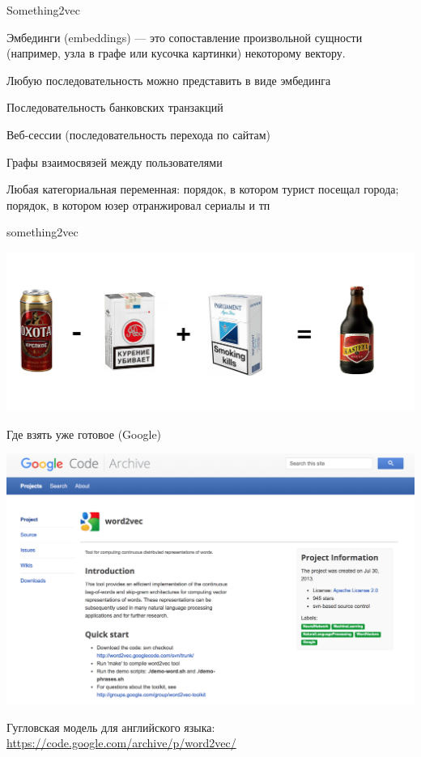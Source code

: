 \documentclass[notes,12pt, aspectratio=169]{beamer}
\newenvironment{wideitemize}{\itemize\addtolength{\itemsep}{10pt}}{\enditemize}
\begin{document}
\begin{frame}{Something2vec}
		\begin{wideitemize} 
			\item \alert{Эмбединги (embeddings)} — это сопоставление произвольной сущности (например, узла в графе или кусочка картинки) некоторому вектору.
			
			\item  Любую последовательность можно представить в виде эмбединга
			
			\item  Последовательность банковских транзакций
			
			\item  Веб-сессии (последовательность перехода по сайтам)
			
			\item Графы взаимосвязей между пользователями 
			
			\item Любая категориальная переменная: порядок, в котором турист посещал города; порядок, в котором юзер отранжировал сериалы и тп
		\end{wideitemize} 
\end{frame} 


\begin{frame}{something2vec}
	\begin{center}
		\includegraphics[width=.8\linewidth]{smth2vec.png}
	\end{center}
\end{frame} 


\begin{frame}{Где взять уже готовое (Google)}
	\begin{center}
		\includegraphics[width=.65\linewidth]{google_wv.png}
	\end{center}

	\vfill
	
	\footnotesize Гугловская модель для английского языка:  {\color{blue} \url{https://code.google.com/archive/p/word2vec/}}
\end{frame} 
	
\end{document}
